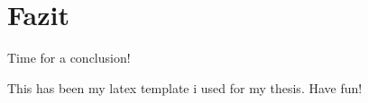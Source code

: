 \documentclass{../Main/main.tex}{subfiles}
\begin{document}
\chapter{Fazit}

Time for a conclusion!

This has been my latex template i used for my thesis. Have fun!
\end{document}
